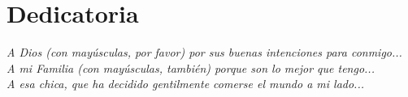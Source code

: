 \chapter*{Dedicatoria}


{\it A Dios (con mayúsculas, por favor) por sus buenas intenciones para conmigo...} \\[2mm]
{\it A mi Familia (con mayúsculas, también) porque son lo mejor que tengo...} \\[2mm]
{\it A esa chica, que ha decidido gentilmente comerse el mundo a mi lado...} \\[2mm]